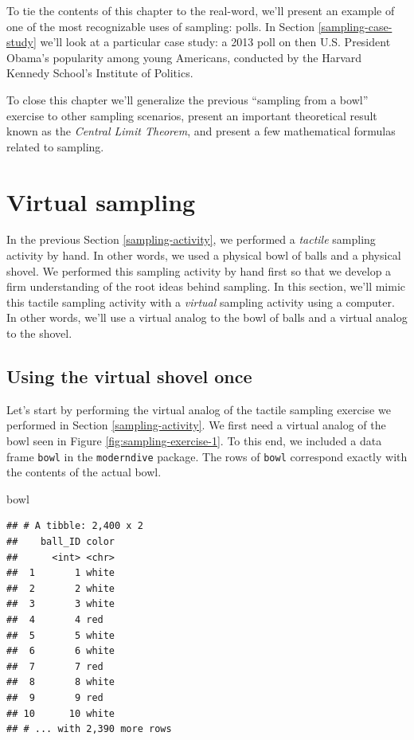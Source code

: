 \documentclass[
]{book}
\newenvironment{Shaded}{\begin{snugshade}}{\end{snugshade}}
\newcommand{\NormalTok}[1]{#1}
\begin{document}
To tie the contents of this chapter to the real-word, we'll present an example of one of the most recognizable uses of sampling: polls. In Section \ref{sampling-case-study} we'll look at a particular case study: a 2013 poll on then U.S. President Obama's popularity among young Americans, conducted by the Harvard Kennedy School's Institute of Politics.

To close this chapter we'll generalize the previous ``sampling from a bowl'' exercise to other sampling scenarios, present an important theoretical result known as the \emph{Central Limit Theorem}, and present a few mathematical formulas related to sampling.

\hypertarget{sampling-simulation}{%
\section{Virtual sampling}\label{sampling-simulation}}

In the previous Section \ref{sampling-activity}, we performed a \emph{tactile} sampling activity by hand. In other words, we used a physical bowl of balls and a physical shovel. We performed this sampling activity by hand first so that we develop a firm understanding of the root ideas behind sampling. In this section, we'll mimic this tactile sampling activity with a \emph{virtual} sampling activity using a computer. In other words, we'll use a virtual analog to the bowl of balls and a virtual analog to the shovel.

\hypertarget{using-the-virtual-shovel-once}{%
\subsection{Using the virtual shovel once}\label{using-the-virtual-shovel-once}}

Let's start by performing the virtual analog of the tactile sampling exercise we performed in Section \ref{sampling-activity}. We first need a virtual analog of the bowl seen in Figure \ref{fig:sampling-exercise-1}. To this end, we included a data frame \texttt{bowl} in the \texttt{moderndive} package. The rows of \texttt{bowl} correspond exactly with the contents of the actual bowl.

\begin{Shaded}
\begin{Highlighting}[]
\NormalTok{bowl}
\end{Highlighting}
\end{Shaded}

\begin{verbatim}
## # A tibble: 2,400 x 2
##    ball_ID color
##      <int> <chr>
##  1       1 white
##  2       2 white
##  3       3 white
##  4       4 red  
##  5       5 white
##  6       6 white
##  7       7 red  
##  8       8 white
##  9       9 red  
## 10      10 white
## # ... with 2,390 more rows
\end{verbatim}
\end{document}
